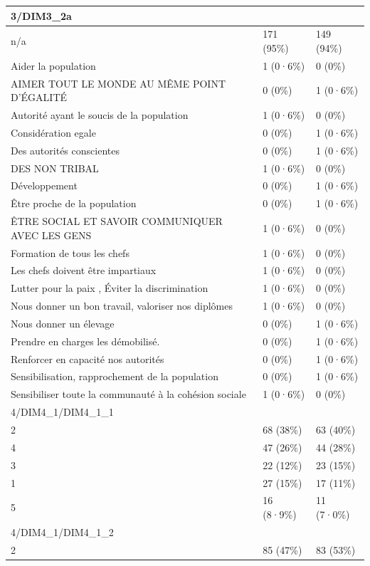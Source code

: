 \documentclass[
]{book}
\begin{document}
\begin{tabular}{l|l|l}
\hline
3/DIM3\_2a &  & \\
\hline
n/a & 171 (95\%) & 149 (94\%)\\
\hline
Aider la population & 1 (0·6\%) & 0 (0\%)\\
\hline
AIMER TOUT LE MONDE AU MÊME POINT D'ÉGALITÉ & 0 (0\%) & 1 (0·6\%)\\
\hline
Autorité ayant le soucis de la population & 1 (0·6\%) & 0 (0\%)\\
\hline
Considération  egale & 0 (0\%) & 1 (0·6\%)\\
\hline
Des autorités conscientes & 0 (0\%) & 1 (0·6\%)\\
\hline
DES NON TRIBAL & 1 (0·6\%) & 0 (0\%)\\
\hline
Développement & 0 (0\%) & 1 (0·6\%)\\
\hline
Être proche de la population & 0 (0\%) & 1 (0·6\%)\\
\hline
ÊTRE SOCIAL ET SAVOIR COMMUNIQUER AVEC LES GENS & 1 (0·6\%) & 0 (0\%)\\
\hline
Formation de tous les chefs & 1 (0·6\%) & 0 (0\%)\\
\hline
Les chefs doivent être impartiaux & 1 (0·6\%) & 0 (0\%)\\
\hline
Lutter pour la paix , Éviter la discrimination & 1 (0·6\%) & 0 (0\%)\\
\hline
Nous donner un bon travail, valoriser nos diplômes & 1 (0·6\%) & 0 (0\%)\\
\hline
Nous donner un élevage & 0 (0\%) & 1 (0·6\%)\\
\hline
Prendre en charges les  démobilisé. & 0 (0\%) & 1 (0·6\%)\\
\hline
Renforcer en capacité nos autorités & 0 (0\%) & 1 (0·6\%)\\
\hline
Sensibilisation, rapprochement de la population & 0 (0\%) & 1 (0·6\%)\\
\hline
Sensibiliser toute la communauté à la cohésion sociale & 1 (0·6\%) & 0 (0\%)\\
\hline
4/DIM4\_1/DIM4\_1\_1 &  & \\
\hline
2 & 68 (38\%) & 63 (40\%)\\
\hline
4 & 47 (26\%) & 44 (28\%)\\
\hline
3 & 22 (12\%) & 23 (15\%)\\
\hline
1 & 27 (15\%) & 17 (11\%)\\
\hline
5 & 16 (8·9\%) & 11 (7·0\%)\\
\hline
4/DIM4\_1/DIM4\_1\_2 &  & \\
\hline
2 & 85 (47\%) & 83 (53\%)\\

\end{tabular}
\end{document}
